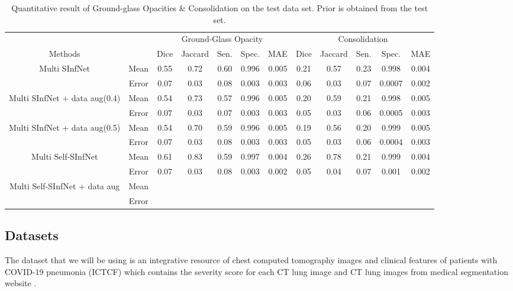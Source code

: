 \begin{table}[!h]
	\centering
	\begin{tabular}{| c | c || c c c c c || c c c c c |}
		\hline
		& &\multicolumn{5}{c||}{Ground-Glass Opacity} & \multicolumn{5}{c|}{Consolidation}\\ \cline{3-12}
		Methods & & Dice & Jaccard & Sen. & Spec. & MAE & Dice & Jaccard & Sen. & Spec. & MAE \\\hline
		Multi SInfNet & Mean & 0.55 & 0.72 & 0.60 & 0.996 & 0.005 & 0.21 & 0.57  &0.23  &0.998  &0.004   \\ \cline{2-12}
		& Error & 0.07 & 0.03 & 0.08 & 0.003 & 0.003 & 0.06 & 0.03 & 0.07 & 0.0007 & 0.002 \\ \hline \hline
		
		Multi SInfNet + data aug(0.4) & Mean & 0.54 & 0.73 & 0.57 & 0.996 & 0.005 & 0.20 & 0.59 & 0.21 & 0.998 & 0.005  \\ \cline{2-12}
		& Error & 0.07 & 0.03 & 0.07 & 0.003 & 0.003 & 0.05 & 0.03 & 0.06 & 0.0005 & 0.003  \\ \hline \hline
		
		Multi SInfNet + data aug(0.5) & Mean & 0.54 & 0.70 & 0.59 & 0.996 & 0.005 & 0.19 & 0.56 & 0.20 & 0.999 & 0.005  \\ \cline{2-12}
		& Error & 0.07 & 0.03 & 0.08 & 0.003 & 0.003 & 0.05 & 0.03 & 0.06 & 0.0004 & 0.003  \\ \hline \hline
		
		Multi Self-SInfNet & Mean & 0.61 & 0.83 & 0.59 & 0.997 & 0.004 & 0.26 & 0.78 & 0.21 & 0.999 & 0.004  \\ \cline{2-12}
		& Error & 0.07 & 0.03 & 0.08 & 0.003 & 0.002 & 0.05 & 0.04 & 0.07 & 0.001 & 0.002  \\ \hline \hline
		
		Multi Self-SInfNet + data aug & Mean & & & & & & & & & &  \\ \cline{2-12}
		& Error & & & & & & & & & &  \\ \hline \hline
	\end{tabular}
	\caption{Quantitative result of Ground-glass Opacities \& Consolidation on the test data set. Prior is obtained from the test set.}
	\label{tab:multi-strongprior}
\end{table}


\subsection{Datasets}
The dataset that we will be using is an integrative resource of chest computed tomography images and clinical features of patients with COVID-19 pneumonia (ICTCF) \cite{ref23} which contains the severity score for each CT lung image and CT lung images from medical segmentation website \cite{ref26}. 

